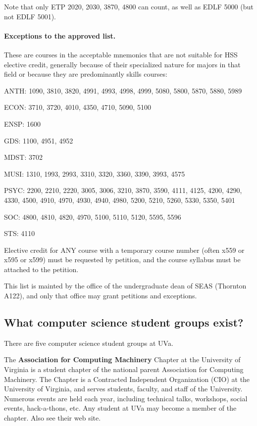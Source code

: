 Note that only ETP 2020, 2030, 3870, 4800 can count, as well as EDLF
5000 (but not EDLF 5001).

\paragraph{Exceptions to the approved list.} These are courses in the
acceptable mnemonics that are not suitable for HSS elective credit,
generally because of their specialized nature for majors in that field
or because they are predominantly skills courses:

\begin{itemlist}
\item ANTH: 1090, 3810, 3820, 4991, 4993, 4998, 4999, 5080, 5800, 5870,
5880, 5989
\item ECON: 3710, 3720, 4010, 4350, 4710, 5090, 5100
\item ENSP: 1600
\item GDS: 1100, 4951, 4952
\item MDST: 3702
\item MUSI: 1310, 1993, 2993, 3310, 3320, 3360, 3390, 3993, 4575
\item PSYC: 2200, 2210, 2220, 3005, 3006, 3210, 3870, 3590, 4111, 4125,
4200, 4290, 4330, 4500, 4910, 4970, 4930, 4940, 4980, 5200, 5210,
5260, 5330, 5350, 5401
\item SOC: 4800, 4810, 4820, 4970, 5100, 5110, 5120, 5595, 5596
\item STS: 4110
\end{itemlist}

Elective credit for ANY course with a temporary course number
(often x559 or x595 or x599) must be requested by petition, and
the course syllabus must be attached to the petition.

This list is mainted by the office of the undergraduate dean of SEAS
(Thornton A122), and only that office may grant petitions and
exceptions.


\subsection{What computer science student groups exist?}
\label{sec-student-groups} 

There are five computer science student groups at UVa.

The {\bf Association for Computing Machinery} Chapter at the
University of Virginia is a student chapter of the national parent
Association for Computing Machinery. The Chapter is a Contracted
Independent Organization (CIO) at the University of Virginia, and
serves students, faculty, and staff of the University. Numerous events
are held each year, including technical talks, workshops, social
events, hack-a-thons, etc.  Any student at UVa may become a member of
the chapter.  Also see their web
site.

